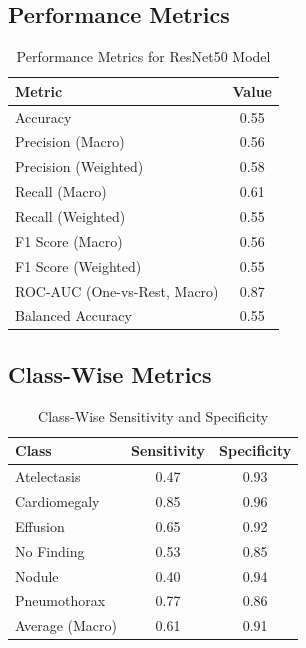 \documentclass[journal]{IEEEtran}
\begin{document}
\subsection{Performance Metrics}

\begin{table}[h!]
    \centering
    \caption{Performance Metrics for ResNet50 Model}
    \label{tab:metrics}
    \begin{tabular}{|l|c|}
        \hline
        \textbf{Metric} & \textbf{Value} \\
        \hline
        Accuracy & 0.55 \\
        Precision (Macro) & 0.56 \\
        Precision (Weighted) & 0.58 \\
        Recall (Macro) & 0.61 \\
        Recall (Weighted) & 0.55 \\
        F1 Score (Macro) & 0.56 \\
        F1 Score (Weighted) & 0.55 \\
        ROC-AUC (One-vs-Rest, Macro) & 0.87 \\
        Balanced Accuracy & 0.55 \\
        \hline
    \end{tabular}
\end{table}

\subsection{Class-Wise Metrics}

\begin{table}[h!]
    \centering
    \caption{Class-Wise Sensitivity and Specificity}
    \label{tab:class_metrics}
    \begin{tabular}{|l|c|c|}
        \hline
        \textbf{Class} & \textbf{Sensitivity} & \textbf{Specificity} \\
        \hline
        Atelectasis & 0.47 & 0.93 \\
        Cardiomegaly & 0.85 & 0.96 \\
        Effusion & 0.65 & 0.92 \\
        No Finding & 0.53 & 0.85 \\
        Nodule & 0.40 & 0.94 \\
        Pneumothorax & 0.77 & 0.86 \\
        \hline
        Average (Macro) & 0.61 & 0.91 \\
        \hline
    \end{tabular}
\end{table}
\end{document}
